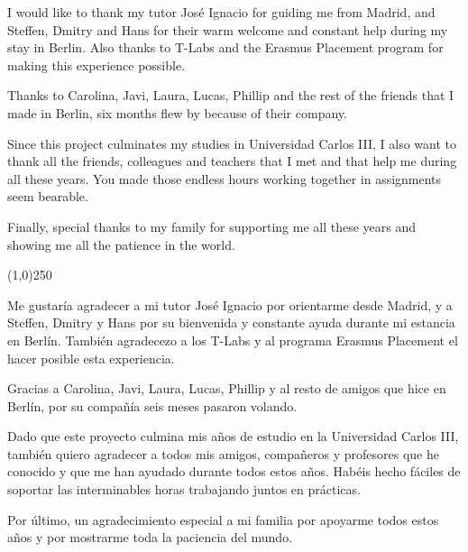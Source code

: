 \begin{acknowledgements}

I would like to thank my tutor José Ignacio for guiding me from Madrid, and Steffen, Dmitry and Hans for their warm welcome and constant help during my stay in Berlin.
Also thanks to T-Labs and the Erasmus Placement program for making this experience possible.

Thanks to Carolina, Javi, Laura, Lucas, Phillip and the rest of the friends that I made in Berlin, six months flew by because of their company.

Since this project culminates my studies in Universidad Carlos III, I also want to thank all the friends, colleagues and teachers that I met and that help me during all these years.
You made those endless hours working together in assignments seem bearable.

Finally, special thanks to my family for supporting me all these years and showing me all the patience in the world.

\begin{center}
  \line(1,0){250}
\end{center}

Me gustaría agradecer a mi tutor José Ignacio por orientarme desde Madrid, y a Steffen, Dmitry y Hans por su bienvenida y constante ayuda durante mi estancia en Berlín.
También agradecezo a los T-Labs y al programa Erasmus Placement el hacer posible esta experiencia.

Gracias a Carolina, Javi, Laura, Lucas, Phillip y al resto de amigos que hice en Berlín, por su compañía seis meses pasaron volando.

Dado que este proyecto culmina mis años de estudio en la Universidad Carlos III, también quiero agradecer a todos mis amigos, compañeros y profesores que he conocido y que me han ayudado durante todos estos años.
Habéis hecho fáciles de soportar las interminables horas trabajando juntos en prácticas.

Por último, un agradecimiento especial a mi familia por apoyarme todos estos años y por mostrarme toda la paciencia del mundo.

\end{acknowledgements}